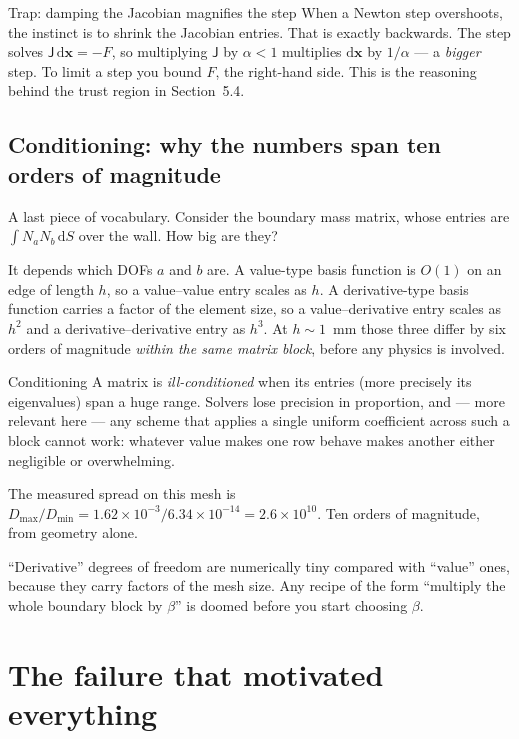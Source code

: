 \documentclass[11pt,a4paper]{article}
\newcommand{\dd}{\mathrm{d}}
\begin{document}
\begin{warnbox}{Trap: damping the Jacobian magnifies the step}
When a Newton step overshoots, the instinct is to shrink the Jacobian entries. That is exactly
backwards. The step solves $\mathsf{J}\,\dd\bm{x}=-F$, so multiplying $\mathsf{J}$ by $\alpha<1$
multiplies $\dd\bm{x}$ by $1/\alpha$ --- a \emph{bigger} step. To limit a step you bound $F$, the
right-hand side. This is the reasoning behind the trust region in Section~5.4.
\end{warnbox}

\subsection{Conditioning: why the numbers span ten orders of magnitude}

A last piece of vocabulary. Consider the boundary mass matrix, whose entries are
$\int N_a N_b\,\dd S$ over the wall. How big are they?

It depends which DOFs $a$ and $b$ are. A value-type basis function is $O(1)$ on an edge of length $h$,
so a value--value entry scales as $h$. A derivative-type basis function carries a factor of the
element size, so a value--derivative entry scales as $h^2$ and a derivative--derivative entry as
$h^3$. At $h\sim1$~mm those three differ by six orders of magnitude \emph{within the same matrix
block}, before any physics is involved.

\begin{concept}{Conditioning}
A matrix is \emph{ill-conditioned} when its entries (more precisely its eigenvalues) span a huge
range. Solvers lose precision in proportion, and --- more relevant here --- any scheme that applies a
single uniform coefficient across such a block cannot work: whatever value makes one row behave makes
another either negligible or overwhelming.

The measured spread on this mesh is $D_{\max}/D_{\min}=1.62\times10^{-3}/6.34\times10^{-14} =
2.6\times10^{10}$. Ten orders of magnitude, from geometry alone.
\end{concept}

\begin{plain}
``Derivative'' degrees of freedom are numerically tiny compared with ``value'' ones, because they
carry factors of the mesh size. Any recipe of the form ``multiply the whole boundary block by
$\beta$'' is doomed before you start choosing $\beta$.
\end{plain}

\section{The failure that motivated everything}
\end{document}
